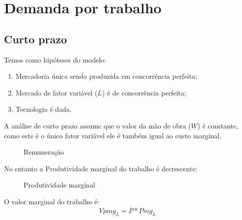 \documentclass[12pt,a4paper,oneside,brazil]{abntex2}
\begin{document}
\section{Demanda por trabalho}
\subsection{Curto prazo}
Temos como hipóteses do modelo:
\begin{enumerate}
	\item Mercadoria única sendo produzida em concorrência perfeita; 
	\item Mercado de fator variável ($L$) é de concorrência perfeita; 
	\item Tecnologia é dada.
\end{enumerate}

A análise de curto prazo assume que o valor da mão de obra ($W$) é constante, como este é o único fator variável ele é também igual ao custo marginal.

\begin{figure}[ht]
	\centering
	\caption{Remuneração}
\end{figure}

No entanto a Produtividade marginal do trabalho é decrescente:

\begin{figure}[ht!]
	\centering
	\caption{Produtividade marginal}
\end{figure}

O valor marginal do trabalho é:
\begin{equation} \label{vpmg}
	Vpmg_L = \overline{P} * Pmg_L
\end{equation}
\end{document}

